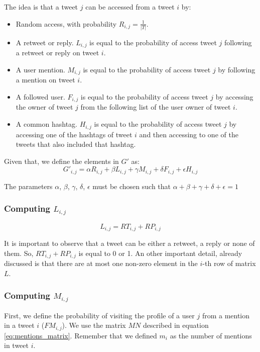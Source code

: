 \documentclass[12pt,a4paper]{article}
\begin{document}
The idea is that a tweet $j$ can be accessed from a tweet $i$ by:
\begin{itemize}
\item Random access, with probability $R_{i,j} = \frac{1}{|T|}$.
\item A retweet or reply. $L_{i,j}$ is equal to the probability of access tweet $j$ following a retweet or reply on tweet $i$.
\item A user mention. $M_{i,j}$ is equal to the probability of access tweet $j$ by following a mention on tweet $i$.
\item A followed user. $F_{i,j}$ is equal to the probability of access tweet $j$ by accessing the owner of tweet $j$ from the following list of the user owner of tweet $i$.
\item A common hashtag. $H_{i,j}$ is equal to the probability of access tweet $j$ by accessing one of the hashtags of tweet $i$ and then accessing to one of the tweets that also included that hashtag.
\end{itemize}

Given that, we define the elements in $G'$ as:
\begin{equation}\label{eq:tweetrank}
G'_{i,j} = \alpha R_{i,j} + \beta L_{i,j} + \gamma M_{i,j} + \delta F_{i,j} + \epsilon H_{i,j}
\end{equation}

The parameters $\alpha$, $\beta$, $\gamma$, $\delta$, $\epsilon$ must be chosen such that  $\alpha + \beta + \gamma + \delta + \epsilon = 1$

\subsubsection*{Computing $L_{i,j}$}
\begin{equation}
L_{i,j} = RT_{i,j} + RP_{i,j}
\end{equation}

It is important to observe that a tweet can be either a retweet, a reply or none of them. So, $RT_{i,j} + RP_{i,j}$ is equal to 0 or 1. An other important detail, already discussed is that there are at most one non-zero element in the $i$-th row of matrix $L$.

\subsubsection*{Computing $M_{i,j}$}
First, we define the probability of visiting the profile of a user $j$ from a mention in a tweet $i$ ($FM_{i,j}$). We use the matrix $MN$ described in equation \ref{eq:mentions_matrix}. Remember that we defined $m_i$ as the number of mentions in tweet $i$.
\end{document}
